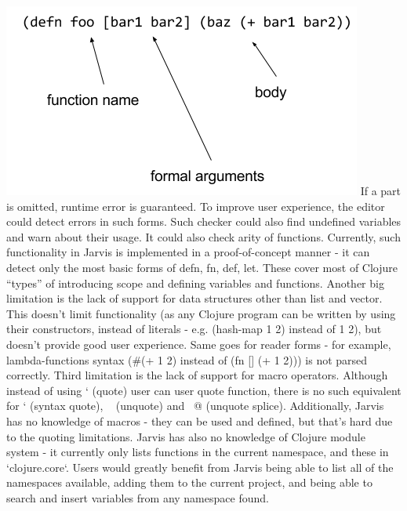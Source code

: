 \documentclass[11pt]{scrartcl}
\begin{document}
\includegraphics[scale=0.5]{img/sexp}
If a part is omitted, runtime error is guaranteed. To improve user experience, the editor could detect errors in such forms. Such checker could also find undefined variables and warn about their usage. It could also check arity of functions. Currently, such functionality in Jarvis is implemented in a proof-of-concept manner - it can detect only the most basic forms of defn, fn, def, let. These cover most of Clojure “types” of introducing scope and defining variables and functions.
Another big limitation is the lack of support for data structures other than list and vector. This doesn’t limit functionality (as any Clojure program can be written by using their constructors, instead of literals - e.g. (hash-map 1 2) instead of {1 2}), but doesn’t provide good user experience. Same goes for reader forms - for example, lambda-functions syntax (\#(+ 1 2) instead of (fn [] (+ 1 2))) is not parsed correctly. Third limitation is the lack of support for macro operators. Although instead of using ‘ (quote) user can user quote function, there is no such equivalent for ` (syntax quote), ~ (unquote) and ~@ (unquote splice). Additionally, Jarvis has no knowledge of macros - they can be used and defined, but that’s hard due to the quoting limitations. Jarvis has also no knowledge of Clojure module system - it currently only lists functions in the current namespace, and these in `clojure.core`. Users would greatly benefit from Jarvis being able to list all of the namespaces available, adding them to the current project, and being able to search and insert variables from any namespace found.
\end{document}
